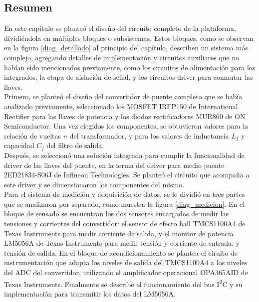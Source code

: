 \subsection{Resumen}

En este capítulo se planteó el diseño del circuito completo de la plataforma, dividiéndola en múltiples bloques o subsistemas. Estos bloques, como se observan en la figura \ref{diag_detallado} al principio del capítulo, describen un sistema más complejo, agregando detalles de implementación y circuitos auxiliares que no habían sido mencionados previamente, como los circuitos de alimentación para los integrados, la etapa de aislación de señal, y los circuitos driver para conmutar las llaves.\\

Primero, se planteó el diseño del convertidor de puente completo que se había analizado previamente, seleccionado los MOSFET {\Medium IRFP150 de International Rectifier} para las llaves de potencia y los diodos rectificadores {\Medium MUR860 de ON Semiconductor}. Una vez elegidos los componentes, se obtuvieron valores para la relación de vueltas $n$ del transformador, y para los valores de inductancia $L_f$ y capacidad $C_f$ del filtro de salida.\\

Después, se seleccionó una solución integrada para cumplir la funcionalidad de driver de las llaves del puente, en la forma del driver para medio puente {\Medium 2ED21834-S06J de Infineon Technologies}. Se planteó el circuito que acompaña a este driver y se dimensionaron los componentes del mismo.\\

Para el sistema de medición y adquisición de datos, se lo dividió en tres partes que se analizaron por separado, como muestra la figura \ref{diag_medicion}. En el bloque de sensado se encuentran los dos sensores encargados de medir las tensiones y corrientes del convertidor: el sensor de efecto hall {\Medium TMCS1100A4 de Texas Instruments} para medir corriente de salida, y el monitor de potencia {\Medium LM5056A de Texas Instruments} para medir tensión y corriente de entrada, y tensión de salida. En el bloque de acondicionamiento se plantea el ciruito de instrumentación que adapta los niveles de salida del TMCS1100A4 a los niveles del ADC del convertidor, utilizando el amplificador operacional {\Medium OPA365AID de Texas Instruments}. Finalmente se describe el funcionamiento del bus I\textsuperscript{2}C y su implementación para transmitir los datos del LM5056A.\\


